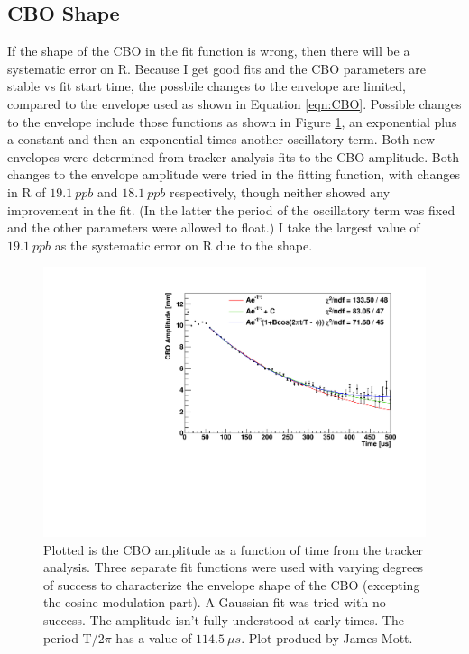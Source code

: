	\subsection{CBO Shape}
	\label{SubSec:CBOShape}

		If the shape of the CBO in the fit function is wrong, then there will be a systematic error on R. Because I get good fits and the CBO parameters are stable vs fit start time, the possbile changes to the envelope are limited, compared to the envelope used as shown in Equation \ref{eqn:CBO}. Possible changes to the envelope include those functions as shown in Figure \ref{fig:CBOShapeAmplitude}, an exponential plus a constant and then an exponential times another oscillatory term. Both new envelopes were determined from tracker analysis fits to the CBO amplitude. Both changes to the envelope amplitude were tried in the fitting function, with changes in R of $\SI{19.1}{ppb}$ and $\SI{18.1}{ppb}$ respectively, though neither showed any improvement in the fit. (In the latter the period of the oscillatory term was fixed and the other parameters were allowed to float.) I take the largest value of $\SI{19.1}{ppb}$ as the systematic error on R due to the shape.

		\begin{figure}[]
			\centering
			\includegraphics[width=.7\textwidth]{AmplFitOptions}
		    \caption[CBOShapeAmplitude]{Plotted is the CBO amplitude as a function of time from the tracker analysis. Three separate fit functions were used with varying degrees of success to characterize the envelope shape of the CBO (excepting the cosine modulation part). A Gaussian fit was tried with no success. The amplitude isn't fully understood at early times. The period T/$2\pi$ has a value of $\SI{114.5}{\mu s}$. Plot producd by James Mott.}
		    \label{fig:CBOShapeAmplitude}
		\end{figure}

